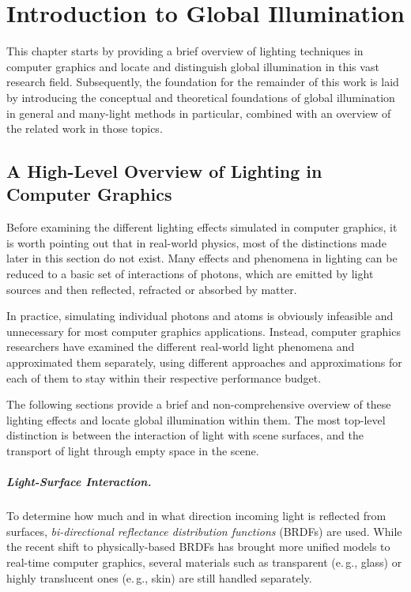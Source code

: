 
\chapter{Introduction to Global Illumination}
\label{chap:introductionGI}

This chapter starts by providing a brief overview of lighting techniques in computer graphics and locate and distinguish global illumination in this vast research field.
Subsequently, the foundation for the remainder of this work is laid by introducing the conceptual and theoretical foundations of global illumination in general and many-light methods in particular, combined with an overview of the related work in those topics.


\section{A High-Level Overview of Lighting in Computer Graphics}

Before examining the different lighting effects simulated in computer graphics, it is worth pointing out that in real-world physics, most of the distinctions made later in this section do not exist. Many effects and phenomena in lighting can be reduced to a basic set of interactions of photons, which are emitted by light sources and then reflected, refracted or absorbed by matter.

In practice, simulating individual photons and atoms is obviously infeasible and unnecessary for most computer graphics applications. Instead, computer graphics researchers have examined the different real-world light phenomena and approximated them separately, using different approaches and approximations for each of them to stay within their respective performance budget.

The following sections provide a brief and non-comprehensive overview of these lighting effects and locate global illumination within them. The most top-level distinction is between the interaction of light with scene surfaces, and the transport of light through empty space in the scene.

\paragraph{Light-Surface Interaction.}

To determine how much and in what direction incoming light is reflected from surfaces, \textit{bi-directional reflectance distribution functions} (BRDFs) are used. While the recent shift to physically-based BRDFs has brought more unified models to real-time computer graphics, several materials such as transparent (e.\,g., glass) or highly translucent ones (e.\,g., skin) are still handled separately.


